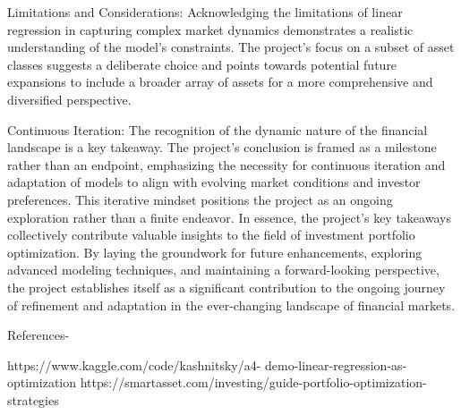 \documentclass[conference]{IEEEtran}
\begin{document}
Limitations and Considerations:
Acknowledging the limitations of linear regression in capturing complex market dynamics demonstrates a realistic understanding of the model's constraints. The project's focus on a subset of asset classes suggests a deliberate choice and points towards potential future expansions to include a broader array of assets for a more comprehensive and diversified perspective.

Continuous Iteration:
The recognition of the dynamic nature of the financial landscape is a key takeaway. The project's conclusion is framed as a milestone rather than an endpoint, emphasizing the necessity for continuous iteration and adaptation of models to align with evolving market conditions and investor preferences. This iterative mindset positions the project as an ongoing exploration rather than a finite endeavor.
In essence, the project's key takeaways collectively contribute valuable insights to the field of investment portfolio optimization. By laying the groundwork for future enhancements, exploring advanced modeling techniques, and maintaining a forward-looking perspective, the project establishes itself as a significant contribution to the ongoing journey of refinement and adaptation in the ever-changing landscape of financial markets.

References-

https://www.kaggle.com/code/kashnitsky/a4- demo-linear-regression-as-optimization
https://smartasset.com/investing/guide-portfolio-optimization- strategies

\\




\end{document}
